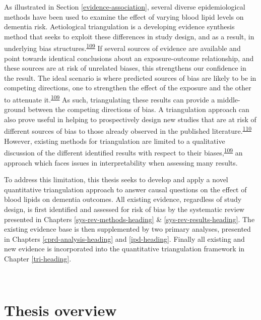 \documentclass[a4paper, twoside]{templates/ociamthesis}
\begin{document}
As illustrated in Section \ref{evidence-association}, several diverse epidemiological methods have been used to examine the effect of varying blood lipid levels on dementia risk. Aetiological triangulation is a developing evidence synthesis method that seeks to exploit these differences in study design, and as a result, in underlying bias structures.\textsuperscript{\protect\hyperlink{ref-lawlor2016}{109}} If several sources of evidence are available and point towards identical conclusions about an exposure-outcome relationship, and these sources are at risk of unrelated biases, this strengthens our confidence in the result. The ideal scenario is where predicted sources of bias are likely to be in competing directions, one to strengthen the effect of the exposure and the other to attenuate it.\textsuperscript{\protect\hyperlink{ref-lawlor2016}{109}} As such, triangulating these results can provide a middle-ground between the competing directions of bias. A triangulation approach can also prove useful in helping to prospectively design new studies that are at risk of different sources of bias to those already observed in the published literature.\textsuperscript{\protect\hyperlink{ref-munafo2018}{110}} However, existing methods for triangulation are limited to a qualitative discussion of the different identified results with respect to their biases,\textsuperscript{\protect\hyperlink{ref-lawlor2016}{109}} an approach which faces issues in interpretability when assessing many results.

To address this limitation, this thesis seeks to develop and apply a novel quantitative triangulation approach to answer causal questions on the effect of blood lipids on dementia outcomes. All existing evidence, regardless of study design, is first identified and assessed for risk of bias by the systematic review presented in Chapters \ref{sys-rev-methods-heading} \& \ref{sys-rev-results-heading}. The existing evidence base is then supplemented by two primary analyses, presented in Chapters \ref{cprd-analysis-heading} and \ref{ipd-heading}. Finally all existing and new evidence is incorporated into the quantitative triangulation framework in Chapter \ref{tri-heading}.

~

\hypertarget{background-thesis-overview}{%
\section{Thesis overview}\label{background-thesis-overview}}
\end{document}
